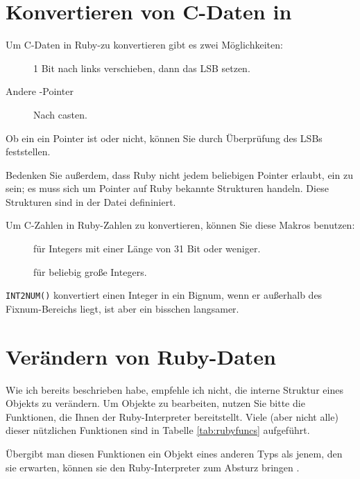 \section{Konvertieren von C-Daten in \VALUEs}
\label{sec:c2value}

Um C-Daten in Ruby-\VALUEs zu konvertieren gibt es zwei Möglichkeiten:

\begin{description}
\item[] 1 Bit nach links verschieben, dann das LSB
  setzen.
\item[Andere \VALUE-Pointer] Nach \VALUE casten.
\end{description}

Ob ein \VALUE ein Pointer ist oder nicht, können Sie
durch Überprüfung des LSBs feststellen.

Bedenken Sie außerdem, dass Ruby nicht jedem beliebigen Pointer
erlaubt, ein \VALUE zu sein; es muss sich um Pointer auf Ruby bekannte
Strukturen handeln. Diese Strukturen sind in der Datei 
defininiert.

Um C-Zahlen in Ruby-Zahlen zu konvertieren, können Sie diese Makros
benutzen:

\begin{description}
\item[] für Integers mit einer Länge von 31 Bit oder
  weniger.
\item[] für beliebig große Integers.
\end{description}

\verb+INT2NUM()+ konvertiert einen Integer in ein Bignum, wenn er
außerhalb des Fixnum-Bereichs liegt, ist aber ein bisschen langsamer.

\section{Verändern von Ruby-Daten}
\label{sec:ruby-daten-aendern}

Wie ich bereits beschrieben habe, empfehle ich nicht, die interne
Struktur eines Objekts zu verändern. Um Objekte zu bearbeiten, nutzen
Sie bitte die Funktionen, die Ihnen der Ruby-Interpreter bereitstellt.
Viele (aber nicht alle) dieser nützlichen Funktionen sind in Tabelle
\ref{tab:rubyfuncs} aufgeführt.

\begin{notice}
  Übergibt man diesen Funktionen ein Objekt eines anderen Typs als
  jenem, den sie erwarten, können sie den Ruby-Interpreter zum Absturz
  bringen .
\end{notice}

